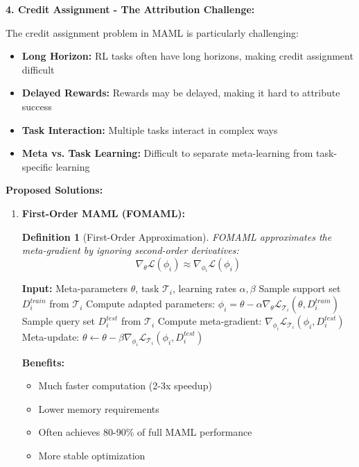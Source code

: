 \documentclass[12pt]{article}
\newcommand{\ieee}[1]{\textcolor{IEEEBlue}{\textbf{#1}}}
\newtheorem{definition}{Definition}
\begin{document}
{{			\textbf{4. Credit Assignment - The Attribution Challenge:}
			
			The credit assignment problem in MAML is particularly challenging:
			
			\begin{itemize}
				\item \textbf{Long Horizon:} RL tasks often have long horizons, making credit assignment difficult
				\item \textbf{Delayed Rewards:} Rewards may be delayed, making it hard to attribute success
				\item \textbf{Task Interaction:} Multiple tasks interact in complex ways
				\item \textbf{Meta vs. Task Learning:} Difficult to separate meta-learning from task-specific learning
			\end{itemize}
			
			\ieee{Proposed Solutions:}
			
			\begin{enumerate}
				\item \textbf{First-Order MAML (FOMAML):}
				
				\begin{definition}[First-Order Approximation]
				FOMAML approximates the meta-gradient by ignoring second-order derivatives:
				\begin{equation}
				\nabla_\theta \mathcal{L}(\phi_i) \approx \nabla_{\phi_i} \mathcal{L}(\phi_i)
				\end{equation}
				\end{definition}
				
				\begin{algorithm}[H]
				\caption{First-Order MAML}
				\begin{algorithmic}[1]
				\STATE \textbf{Input:} Meta-parameters $\theta$, task $\mathcal{T}_i$, learning rates $\alpha, \beta$
				\STATE Sample support set $D_i^{train}$ from $\mathcal{T}_i$
				\STATE Compute adapted parameters: $\phi_i = \theta - \alpha\nabla_\theta \mathcal{L}_{\mathcal{T}_i}(\theta, D_i^{train})$
				\STATE Sample query set $D_i^{test}$ from $\mathcal{T}_i$
				\STATE Compute meta-gradient: $\nabla_{\phi_i} \mathcal{L}_{\mathcal{T}_i}(\phi_i, D_i^{test})$
				\STATE Meta-update: $\theta \leftarrow \theta - \beta \nabla_{\phi_i} \mathcal{L}_{\mathcal{T}_i}(\phi_i, D_i^{test})$
				\end{algorithmic}
				\end{algorithm}
				
				\textbf{Benefits:}
				\begin{itemize}
					\item Much faster computation (2-3x speedup)
					\item Lower memory requirements
					\item Often achieves 80-90\% of full MAML performance
					\item More stable optimization
				\end{itemize}
				

\end{enumerate}}}
\end{document}
